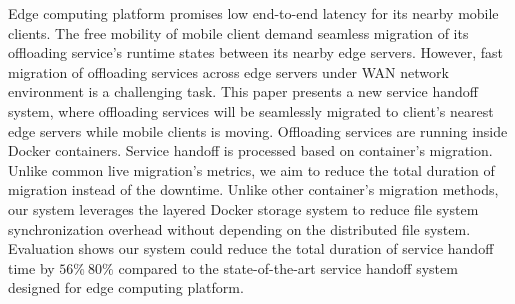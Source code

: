 

Edge computing platform promises low end-to-end latency for its nearby mobile clients. 
The free mobility of mobile client demand seamless migration of its offloading service's runtime states between its nearby edge servers.
However, fast migration of offloading services across edge servers under WAN network environment is a challenging task. 
This paper presents a new service handoff system, where offloading services will be seamlessly migrated to client's nearest edge servers while mobile clients is moving. Offloading services are running inside Docker containers. Service handoff is processed based on container's migration. Unlike common live migration's metrics, we aim to reduce the total duration of migration instead of the downtime. Unlike other container's migration methods, our system leverages the layered Docker storage system to reduce file system synchronization overhead without depending on the distributed file system. Evaluation shows our system could reduce the total duration of service handoff time by $56\%~ 80\%$ compared to the state-of-the-art service handoff system designed for edge computing platform.


